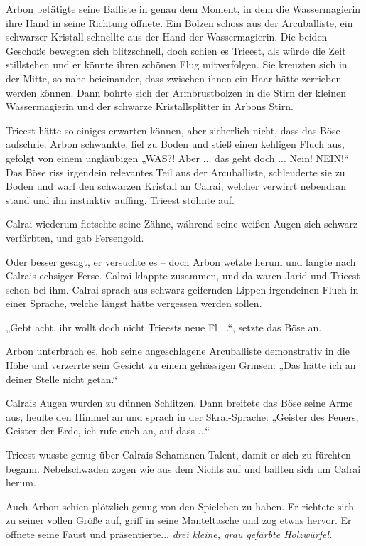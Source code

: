 Arbon betätigte seine Balliste in genau dem Moment, in dem die Wassermagierin ihre Hand in seine Richtung öffnete. Ein Bolzen schoss aus der Arcuballiste, ein schwarzer Kristall schnellte aus der Hand der Wassermagierin. Die beiden Geschoße bewegten sich blitzschnell, doch schien es Trieest, als würde die Zeit stillstehen und er könnte ihren schönen Flug mitverfolgen. Sie kreuzten sich in der Mitte, so nahe beieinander, dass zwischen ihnen ein Haar hätte zerrieben werden können. Dann bohrte sich der Armbrustbolzen in die Stirn der kleinen Wassermagierin und der schwarze Kristallsplitter in Arbons Stirn.

Trieest hätte so einiges erwarten können, aber sicherlich nicht, dass das Böse aufschrie. Arbon schwankte, fiel zu Boden und stieß einen kehligen Fluch aus, gefolgt von einem ungläubigen „WAS?! Aber ... das geht doch ... Nein! NEIN!“ Das Böse riss irgendein relevantes Teil aus der Arcuballiste, schleuderte sie zu Boden und warf den schwarzen Kristall an Calrai, welcher verwirrt nebendran stand und ihn instinktiv auffing. Trieest stöhnte auf.

Calrai wiederum fletschte seine Zähne, während seine weißen Augen sich schwarz verfärbten, und gab Fersengold.

Oder besser gesagt, er versuchte es – doch Arbon wetzte herum und langte nach Calrais echsiger Ferse. Calrai klappte zusammen, und da waren Jarid und Trieest schon bei ihm. Calrai sprach aus schwarz geifernden Lippen irgendeinen Fluch in einer Sprache, welche längst hätte vergessen werden sollen.

„Gebt acht, ihr wollt doch nicht Trieests neue Fl ...“, setzte das Böse an.

Arbon unterbrach es, hob seine angeschlagene Arcuballiste demonstrativ in die Höhe und verzerrte sein Gesicht zu einem gehässigen Grinsen: „Das hätte ich an deiner Stelle nicht getan.“

Calrais Augen wurden zu dünnen Schlitzen. Dann breitete das Böse seine Arme aus, heulte den Himmel an und sprach in der Skral-Sprache: „Geister des Feuers, Geister der Erde, ich rufe euch an, auf dass ...“

Trieest wusste genug über Calrais Schamanen-Talent, damit er sich zu fürchten begann. Nebelschwaden zogen wie aus dem Nichts auf und ballten sich um Calrai herum.

Auch Arbon schien plötzlich genug von den Spielchen zu haben. Er richtete sich zu seiner vollen Größe auf, griff in seine Manteltasche und zog etwas hervor. Er öffnete seine Faust und präsentierte... \textit{drei kleine, grau gefärbte Holzwürfel.}



